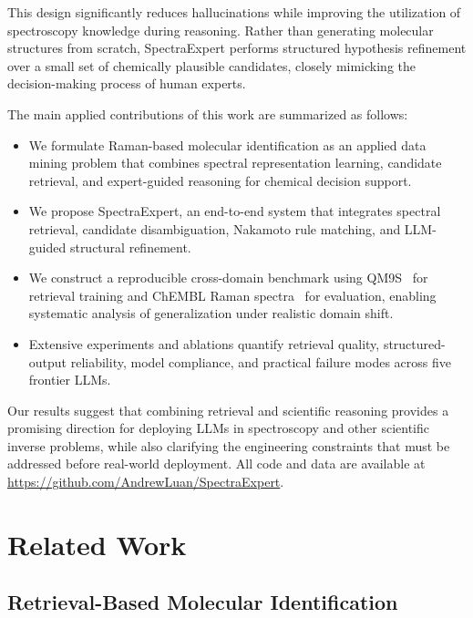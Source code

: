 \documentclass[conference]{IEEEtran}
\begin{document}
This design significantly reduces hallucinations while improving the utilization of spectroscopy knowledge during reasoning. Rather than generating molecular structures from scratch, SpectraExpert performs structured hypothesis refinement over a small set of chemically plausible candidates, closely mimicking the decision-making process of human experts.

The main applied contributions of this work are summarized as follows:

\begin{itemize}
\item We formulate Raman-based molecular identification as an applied data mining problem that combines spectral representation learning, candidate retrieval, and expert-guided reasoning for chemical decision support.

\item We propose SpectraExpert, an end-to-end system that integrates spectral retrieval, candidate disambiguation, Nakamoto rule matching, and LLM-guided structural refinement.

\item We construct a reproducible cross-domain benchmark using QM9S~\cite{zou2023deep} for retrieval training and ChEMBL Raman spectra~\cite{liang2025dataset} for evaluation, enabling systematic analysis of generalization under realistic domain shift.

\item Extensive experiments and ablations quantify retrieval quality, structured-output reliability, model compliance, and practical failure modes across five frontier LLMs.

\end{itemize}

Our results suggest that combining retrieval and scientific reasoning provides a promising direction for deploying LLMs in spectroscopy and other scientific inverse problems, while also clarifying the engineering constraints that must be addressed before real-world deployment.
All code and data are available at \url{https://github.com/AndrewLuan/SpectraExpert}.

\section{Related Work}

\subsection{Retrieval-Based Molecular Identification}
\end{document}
